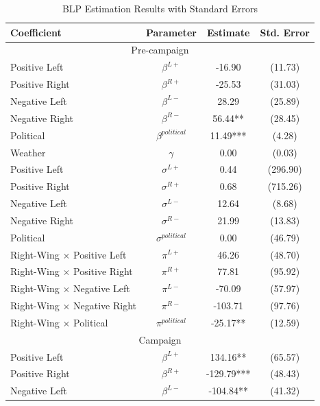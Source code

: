 \documentclass[12pt]{article}
\begin{document}
	\begin{table}[!htbp]
					\caption{BLP Estimation Results with Standard Errors}
					\label{tab:results_blp}
		\centering
		\begin{threeparttable}
			\begin{tabular}{lccc}
				\hline
				\textbf{Coefficient} & \textbf{Parameter} & \textbf{Estimate} & \textbf{Std. Error} \\
				\hline
				\multicolumn{4}{c}{Pre-campaign} \\
				\hline
				\hline
				Positive Left & $\beta^{L+}$ & -16.90 & (11.73) \\
				Positive Right & $\beta^{R+}$ & -25.53 & (31.03) \\
				Negative Left & $\beta^{L-}$ & 28.29 & (25.89) \\
				Negative Right & $\beta^{R-}$ & 56.44** & (28.45) \\
				Political & $\beta^{political}$ & 11.49*** & (4.28) \\
				Weather & $\gamma$ & 0.00 & (0.03) \\
				\hline
				Positive Left & $\sigma^{L+}$ & 0.44 & (296.90) \\
				Positive Right & $\sigma^{R+}$ & 0.68 & (715.26) \\
				Negative Left & $\sigma^{L-}$ & 12.64 & (8.68) \\
				Negative Right & $\sigma^{R-}$ & 21.99 & (13.83) \\
				Political & $\sigma^{political}$ & 0.00 & (46.79) \\
				\hline
				Right-Wing $\times$  Positive Left & $\pi^{L+}$ & 46.26 & (48.70) \\
				Right-Wing $\times$  Positive Right & $\pi^{R+}$ & 77.81 & (95.92) \\
				Right-Wing $\times$  Negative Left & $\pi^{L-}$ & -70.09 & (57.97) \\
				Right-Wing $\times$  Negative Right & $\pi^{R-}$ & -103.71 & (97.76) \\
				Right-Wing $\times$  Political & $\pi^{political}$ & -25.17** & (12.59) \\
				\hline
				\hline
				\multicolumn{4}{c}{Campaign} \\
				\hline
				\hline
				Positive Left & $\beta^{L+}$ & 134.16** & (65.57) \\
				Positive Right & $\beta^{R+}$ & -129.79*** & (48.43) \\
				Negative Left & $\beta^{L-}$ & -104.84** & (41.32) \\

\end{tabular}
\end{threeparttable}
\end{table}
\end{document}
